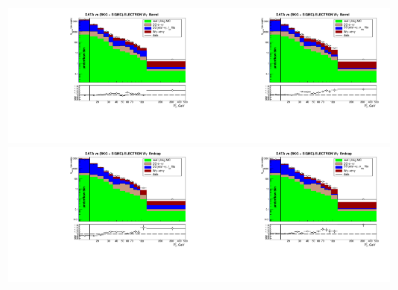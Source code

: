 \begin{figure}[htb]
  \begin{center}
   \includegraphics[width=0.45\textwidth]{../figs/figs_v11/ELECTRON_WGamma/PrepareYields/c_DATAvsBkgPlusSigMCc_ELECTRON_WGamma_TEMPL_CHISO_UNblind__Barrel__phoEt.pdf}\includegraphics[width=0.45\textwidth]{../figs/figs_v11/ELECTRON_WGamma/PrepareYields/c_DATAvsBkgPlusSigMCc_ELECTRON_WGamma_TEMPL_SIHIH_UNblind__Barrel__phoEt.pdf}  \\
   \includegraphics[width=0.45\textwidth]{../figs/figs_v11/ELECTRON_WGamma/PrepareYields/c_DATAvsBkgPlusSigMCc_ELECTRON_WGamma_TEMPL_CHISO_UNblind__Endcap__phoEt.pdf}\includegraphics[width=0.45\textwidth]{../figs/figs_v11/ELECTRON_WGamma/PrepareYields/c_DATAvsBkgPlusSigMCc_ELECTRON_WGamma_TEMPL_SIHIH_UNblind__Endcap__phoEt.pdf}  \\

\end{center}
\end{figure}
